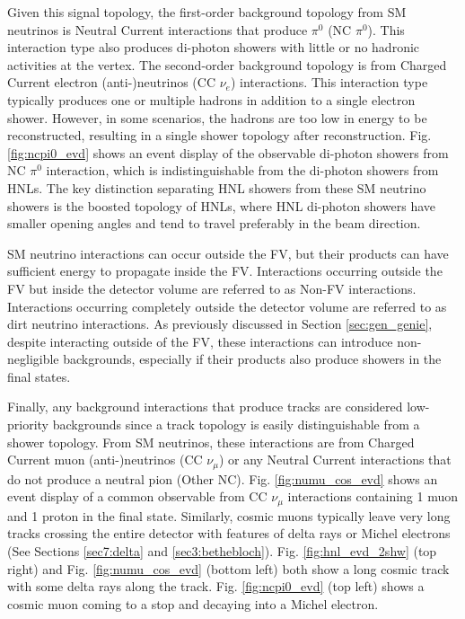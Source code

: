 Given this signal topology, the first-order background topology from SM neutrinos is Neutral Current interactions that produce $\pi^0$ (NC $\pi^0$).
This interaction type also produces di-photon showers with little or no hadronic activities at the vertex.
The second-order background topology is from Charged Current electron (anti-)neutrinos (CC $\nu_e$) interactions.
This interaction type typically produces one or multiple hadrons in addition to a single electron shower.
However, in some scenarios, the hadrons are too low in energy to be reconstructed, resulting in a single shower topology after reconstruction.
Fig. \ref{fig:ncpi0_evd} shows an event display of the observable di-photon showers from NC $\pi^0$ interaction, which is indistinguishable from the di-photon showers from HNLs.
The key distinction separating HNL showers from these SM neutrino showers is the boosted topology of HNLs, where HNL di-photon showers have smaller opening angles and tend to travel preferably in the beam direction. 

SM neutrino interactions can occur outside the FV, but their products can have sufficient energy to propagate inside the FV.
Interactions occurring outside the FV but inside the detector volume are referred to as Non-FV interactions.
Interactions occurring completely outside the detector volume are referred to as dirt neutrino interactions.
As previously discussed in Section \ref{sec:gen_genie}, despite interacting outside of the FV, these interactions can introduce non-negligible backgrounds, especially if their products also produce showers in the final states. 

Finally, any background interactions that produce tracks are considered low-priority backgrounds since a track topology is easily distinguishable from a shower topology.
From SM neutrinos, these interactions are from Charged Current muon (anti-)neutrinos (CC $\nu_\mu$) or any Neutral Current interactions that do not produce a neutral pion (Other NC).
Fig. \ref{fig:numu_cos_evd} shows an event display of a common observable from CC $\nu_\mu$ interactions containing 1 muon and 1 proton in the final state.
Similarly, cosmic muons typically leave very long tracks crossing the entire detector with features of delta rays or Michel electrons (See Sections \ref{sec7:delta} and \ref{sec3:bethebloch}).
Fig. \ref{fig:hnl_evd_2shw} (top right) and Fig. \ref{fig:numu_cos_evd} (bottom left) both show a long cosmic track with some delta rays along the track.
Fig. \ref{fig:ncpi0_evd} (top left) shows a cosmic muon coming to a stop and decaying into a Michel electron.

